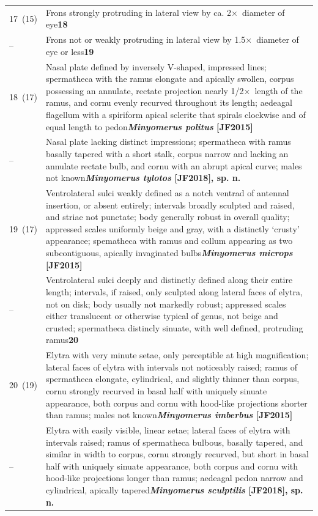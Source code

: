 \documentclass[fleqn,10pt,lineno]{wlpeerj} %
\newcommand{\x}{$\times$~}
\newcommand{\breakfill}{\dotfill\newline\penalty0\hbox{}\nobreak\dotfill}
\begin{document}
\begin{xtabular}{@{}
                p{\dimexpr.1\textwidth-\tabcolsep\relax}
                p{\dimexpr.9\textwidth-\tabcolsep\relax}@{}}
		{17~(15)} & {Frons strongly protruding in lateral view by ca. 2\x diameter of eye}{\dotfill}{\textbf{18}}\\
		{--} & {Frons not or weakly protruding in lateral view by 1.5\x diameter of eye or less}{\dotfill}{\textbf{19}}\\
		
		{18~(17)} & {Nasal plate defined by inversely V-shaped, impressed lines; spermatheca with the ramus elongate and apically swollen, corpus possessing an annulate, rectate projection nearly 1/2\x length of the ramus, and cornu evenly recurved throughout its length; aedeagal flagellum with a spiriform apical sclerite that spirals clockwise and of equal length to pedon}{\breakfill}{\textbf{\textit{Minyomerus politus} [JF2015]}}\\
		{--} & {Nasal plate lacking distinct impressions; spermatheca with ramus basally tapered with a short stalk, corpus narrow and lacking an annulate rectate bulb, and cornu with an abrupt apical curve; males not known}{\dotfill}{\textbf{\textit{Minyomerus tylotos} [JF2018], sp. n.}}\\		
		
		{19~(17)} & {Ventrolateral sulci weakly defined as a notch ventrad of antennal insertion, or absent entirely; intervals broadly sculpted and raised, and striae not punctate; body generally robust in overall quality; appressed scales uniformly beige and gray, with a
distinctly ‘crusty’ appearance; spematheca with ramus and collum appearing
as two subcontiguous, apically invaginated bulbs}{\dotfill}{\textbf{\textit{Minyomerus microps} [JF2015]}}\\
		{--} & {Ventrolateral sulci deeply and distinctly defined along their entire length; intervals, if raised, only sculpted along lateral faces of elytra, not on disk; body usually not markedly robust; appressed scales either translucent or otherwise typical of genus, not beige and crusted; spermatheca distincly sinuate, with well defined, protruding ramus}{\dotfill}{\textbf{20}}\\
		
		{20~(19)} & {Elytra with very minute setae, only perceptible at high magnification; lateral faces of elytra with intervals not noticeably raised; ramus of spermatheca elongate, cylindrical, and slightly thinner than corpus, cornu strongly recurved in basal half with uniquely sinuate appearance, both corpus and cornu with hood-like projections shorter than ramus; males not known}{\breakfill}{\textbf{\textit{Minyomerus imberbus} [JF2015]}}\\
		{--} & {Elytra with easily visible, linear setae; lateral faces of elytra with intervals raised; ramus of spermatheca bulbous, basally tapered, and similar in width to corpus, cornu strongly recurved, but short in basal half with uniquely sinuate appearance, both corpus and cornu with hood-like projections longer than ramus; aedeagal pedon narrow and cylindrical, apically tapered}{\breakfill}{\textbf{\textit{Minyomerus sculptilis} [JF2018], sp. n.}}\\
	\end{xtabular}
	
\end{document}
